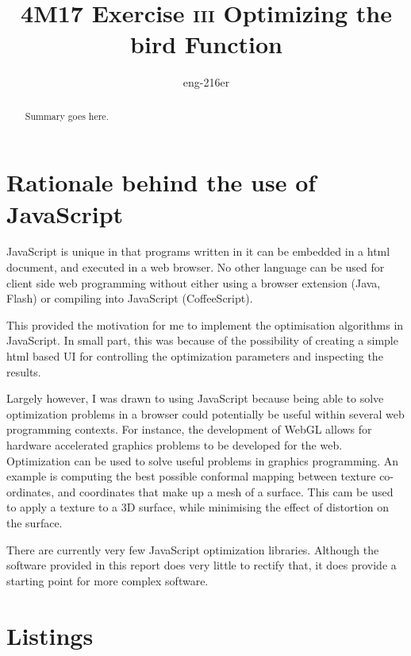 \documentclass[a4paper,12pt]{article}
\begin{document}

\title{4M17 Exercise \textsc{iii} Optimizing the bird Function}
\author{eng-216er}

\maketitle


\begin{abstract}
Summary goes here.
\end{abstract}

\newpage
\tableofcontents
\listoffigures
\listoftables
\newpage

\section{ Rationale behind the use of JavaScript }

 JavaScript is unique in that programs written in it can be embedded in a html document, and executed in a web browser. 
No other language can be used for client side web programming without either using a browser extension (Java, Flash) or compiling into JavaScript (CoffeeScript).

This provided the motivation for me to implement the optimisation algorithms in JavaScript. 
In small part, this was because of the possibility of creating a simple html based UI for controlling the optimization parameters and inspecting the results. 

Largely however, I was drawn to using JavaScript because being able to solve optimization problems in a browser could potentially be useful within several web programming contexts. 
For instance, the  development of WebGL allows for hardware accelerated graphics problems to be developed for the web. 
Optimization can be used to solve useful problems in graphics programming.
An example is computing the best possible conformal mapping between texture co-ordinates, and coordinates that make up a mesh of a surface. 
This cam be used to apply a texture to a 3D surface, while minimising the effect of distortion on the surface.

There are currently very few JavaScript optimization libraries. 
Although the software provided in this report does very little to rectify that, it does provide a starting point for more complex software. 


\newpage
\appendix

\section{ Listings }
\end{document}
